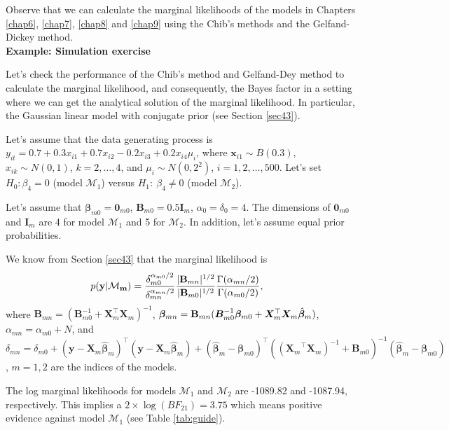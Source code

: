 Observe that we can calculate the marginal likelihoods of the models in Chapters \ref{chap6}, \ref{chap7}, \ref{chap8} and \ref{chap9} using the Chib's methods and the Gelfand-Dickey method.\\
    

\textbf{Example: Simulation exercise}

Let's check the performance of the Chib's method and Gelfand-Dey method to calculate the marginal likelihood, and consequently, the Bayes factor in a setting where we can get the analytical solution of the marginal likelihood. In particular, the Gaussian linear model with conjugate prior (see Section \ref{sec43}).

Let's assume that the data generating process is $y_{it}=0.7+0.3x_{i1}+0.7x_{i2}-0.2x_{i3}+0.2x_{i4}\mu_i$, where $\bm{x}_{i1}\sim B(0.3)$, $x_{ik}\sim N(0,1)$, $k=2,\dots,4$, and $\mu_i\sim N(0,2^2)$, $i=1,2,\dots,500$. Let's set $H_0:\beta_4={0}$ (model $\mathcal{M}_1$) versus $H_1:\ \beta_4\neq {0}$ (model $\mathcal{M}_2$).

Let's assume that $\bm{\beta}_{m0}=\bm{0}_{m0}$, $\bm{B}_{m0}=0.5\bm{I}_{m}$, $\alpha_0=\delta_0=4$. The dimensions of $\bm{0}_{m0}$ and $\bm{I}_{m}$ are 4 for model $\mathcal{M}_1$ and 5 for $\mathcal{M}_2$. In addition, let's assume equal prior probabilities.  

We know from Section \ref{sec43} that the marginal likelihood is
\begin{align*}
	p(\bf{y}|\mathcal{M}_m)&=\frac{\delta_{m0}^{\alpha_{m0}/2}}{\delta_{mn}^{\alpha_{mn}/2}}\frac{|{\bf{B}}_{mn}|^{1/2}}{|{\bf{B}}_{m0}|^{1/2}}\frac{\Gamma(\alpha_{mn}/2)}{\Gamma(\alpha_{m0}/2)},
\end{align*}
where  ${{\bm{B}}}_{mn} = ({\bm{B}}_{m0}^{-1} + {\bm{X}}_m^{\top}{\bm{X}}_m)^{-1}$, $\bm{\beta}_{mn} = {{\bf{B}}}_{mn}({\bm{B}}_{m0}^{-1}\bm{\beta}_{m0} + {\bm{X}}_m^{\top}{\bm{X}}_m\hat{\bm{\beta}}_m)$, $\alpha_{mn}=\alpha_{m0}+N$, and $\delta_{mn}=\delta_{m0}+({\bm{y}}-{\bm{X}}_m\hat{\bm{\beta}}_m)^{\top}({\bm{y}}-{\bm{X}}_m\hat{\bm{\beta}}_m)+(\hat{\bm{\beta}}_m-\bm{\beta}_{m0})^{\top}(({\bm{X}_m}^{\top}{\bm{X}_m})^{-1}+{\bm{B}}_{m0})^{-1}(\hat{\bm{\beta}}_m-\bm{\beta}_{m0})$, $m=1,2$ are the indices of the models.

The log marginal likelihoods for models $\mathcal{M}_1$ and $\mathcal{M}_2$ are -1089.82 and -1087.94, respectively. This implies a $2\times\log(BF_{21})=3.75$ which means positive evidence against model $\mathcal{M}_1$ (see Table \ref{tab:guide}).

